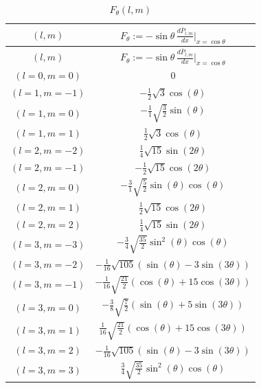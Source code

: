 \begin{center}
\begin{longtable}{|c|c|}
\caption{$F_\theta(l,m)$} \\
\hline
\boldmath \rule[-9pt]{0pt}{21pt}$(l,m)$ & $F_\theta := -\sin\theta \, \frac{d\bar{P}_{l,m}}{dx}\Big|_{x=\cos\theta}$\unboldmath \\
\hline
\endfirsthead
\hline
\boldmath \rule[-9pt]{0pt}{21pt}$(l,m)$ & $F_\theta := -\sin\theta \, \frac{d\bar{P}_{l,m}}{dx}\Big|_{x=\cos\theta}$\unboldmath \\
\hline
\endhead
$(l=0, m=0)$ & $0$ \\ \hline
\rowcolor{gray!15}
$(l=1, m=-1)$ & $-\frac{1}{2} \sqrt{3} \cos (\theta )$ \\ \hline
$(l=1, m=0)$ & $-\frac{1}{1} \sqrt{\frac{3}{2}} \sin (\theta )$ \\ \hline
\rowcolor{gray!15}
$(l=1, m=1)$ & $\frac{1}{2} \sqrt{3} \cos (\theta )$ \\ \hline
$(l=2, m=-2)$ & $\frac{1}{4} \sqrt{15} \sin (2 \theta )$ \\ \hline
\rowcolor{gray!15}
$(l=2, m=-1)$ & $-\frac{1}{2} \sqrt{15} \cos (2 \theta )$ \\ \hline
$(l=2, m=0)$ & $-\frac{3}{1} \sqrt{\frac{5}{2}} \sin (\theta ) \cos (\theta )$ \\ \hline
\rowcolor{gray!15}
$(l=2, m=1)$ & $\frac{1}{2} \sqrt{15} \cos (2 \theta )$ \\ \hline
$(l=2, m=2)$ & $\frac{1}{4} \sqrt{15} \sin (2 \theta )$ \\ \hline
\rowcolor{gray!15}
$(l=3, m=-3)$ & $-\frac{3}{4} \sqrt{\frac{35}{2}} \sin ^2(\theta ) \cos (\theta )$ \\ \hline
$(l=3, m=-2)$ & $-\frac{1}{16} \sqrt{105} (\sin (\theta )-3 \sin (3 \theta ))$ \\ \hline
\rowcolor{gray!15}
$(l=3, m=-1)$ & $-\frac{1}{16} \sqrt{\frac{21}{2}} (\cos (\theta )+15 \cos (3 \theta ))$ \\ \hline
$(l=3, m=0)$ & $-\frac{3}{8} \sqrt{\frac{7}{2}} (\sin (\theta )+5 \sin (3 \theta ))$ \\ \hline
\rowcolor{gray!15}
$(l=3, m=1)$ & $\frac{1}{16} \sqrt{\frac{21}{2}} (\cos (\theta )+15 \cos (3 \theta ))$ \\ \hline
$(l=3, m=2)$ & $-\frac{1}{16} \sqrt{105} (\sin (\theta )-3 \sin (3 \theta ))$ \\ \hline
\rowcolor{gray!15}
$(l=3, m=3)$ & $\frac{3}{4} \sqrt{\frac{35}{2}} \sin ^2(\theta ) \cos (\theta )$ \\ \hline

\end{longtable}
\end{center}
